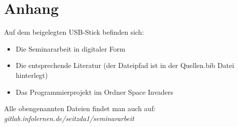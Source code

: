 \chapter{Anhang}
Auf dem beigelegten USB-Stick befinden sich:
\begin{itemize}
\item Die Seminararbeit in digitaler Form
\item Die entsprechende Literatur (der Dateipfad ist in der Quellen.bib Datei hinterlegt)
\item Das Programmierprojekt im Ordner Space Invaders
\end{itemize}
Alle obengenannten Dateien findet man auch auf: \textit{gitlab.infolernen.de/seitzda1/seminararbeit}